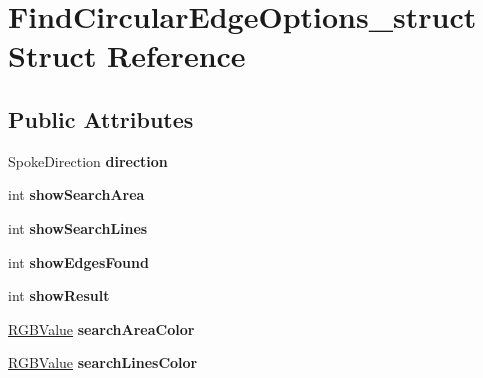 \hypertarget{structFindCircularEdgeOptions__struct}{
\section{FindCircularEdgeOptions\_\-struct Struct Reference}
\label{structFindCircularEdgeOptions__struct}
}
\subsection*{Public Attributes}
\begin{DoxyCompactItemize}
\item 
\hypertarget{structFindCircularEdgeOptions__struct_a93a394a762a165d66d586c14c76b4807}{
SpokeDirection {\bfseries direction}}
\label{structFindCircularEdgeOptions__struct_a93a394a762a165d66d586c14c76b4807}

\item 
\hypertarget{structFindCircularEdgeOptions__struct_a03e14a11183bfad9ad3c36dcaa4efe23}{
int {\bfseries showSearchArea}}
\label{structFindCircularEdgeOptions__struct_a03e14a11183bfad9ad3c36dcaa4efe23}

\item 
\hypertarget{structFindCircularEdgeOptions__struct_a2cbea2b13cd07d90391246781e959201}{
int {\bfseries showSearchLines}}
\label{structFindCircularEdgeOptions__struct_a2cbea2b13cd07d90391246781e959201}

\item 
\hypertarget{structFindCircularEdgeOptions__struct_aacb73df6f637101f189762e94e0dda3e}{
int {\bfseries showEdgesFound}}
\label{structFindCircularEdgeOptions__struct_aacb73df6f637101f189762e94e0dda3e}

\item 
\hypertarget{structFindCircularEdgeOptions__struct_a5399139438ae6844f564b22f8373a2cf}{
int {\bfseries showResult}}
\label{structFindCircularEdgeOptions__struct_a5399139438ae6844f564b22f8373a2cf}

\item 
\hypertarget{structFindCircularEdgeOptions__struct_a9dd0fdad4b2f19a25d63cb3d984c624f}{
\hyperlink{structRGBValue__struct}{RGBValue} {\bfseries searchAreaColor}}
\label{structFindCircularEdgeOptions__struct_a9dd0fdad4b2f19a25d63cb3d984c624f}

\item 
\hypertarget{structFindCircularEdgeOptions__struct_a5aafae666e7589825d3e5ab10e496c8f}{
\hyperlink{structRGBValue__struct}{RGBValue} {\bfseries searchLinesColor}}
\label{structFindCircularEdgeOptions__struct_a5aafae666e7589825d3e5ab10e496c8f}


\end{DoxyCompactItemize}
